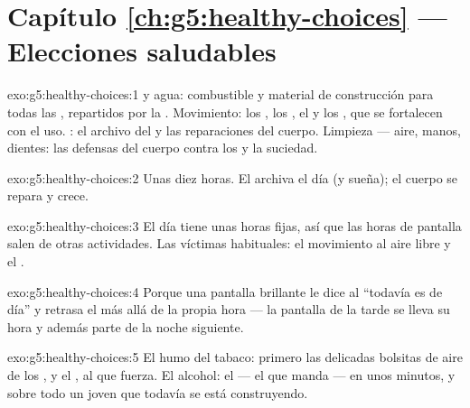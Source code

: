 \section*{Capítulo \ref{ch:g5:healthy-choices} --- Elecciones saludables}

\begin{solution}{exo:g5:healthy-choices:1}
 y agua: combustible y material de construcción para
todas las , repartidos por la . Movimiento: los ,
los , el  y los , que se fortalecen con el uso.
: el archivo del  y las reparaciones del cuerpo. Limpieza
--- aire, manos, dientes: las defensas del cuerpo contra los 
y la suciedad.
\end{solution}

\begin{solution}{exo:g5:healthy-choices:2}
Unas diez horas. El  archiva el día (y sueña); el cuerpo se
repara y crece.
\end{solution}

\begin{solution}{exo:g5:healthy-choices:3}
El día tiene unas horas fijas, así que las horas de pantalla salen de
otras actividades. Las víctimas habituales: el movimiento al aire
libre y el .
\end{solution}

\begin{solution}{exo:g5:healthy-choices:4}
Porque una pantalla brillante le dice al  ``todavía es de día''
y retrasa el  más allá de la propia hora --- la pantalla de la
tarde se lleva su hora y además parte de la noche siguiente.
\end{solution}

\begin{solution}{exo:g5:healthy-choices:5}
El humo del tabaco: primero las delicadas bolsitas de aire de los
, y el , al que fuerza. El alcohol: el  --- el
que manda --- en unos minutos, y sobre todo un  joven que
todavía se está construyendo.
\end{solution}

